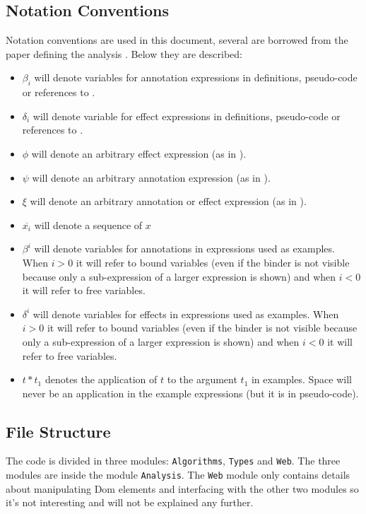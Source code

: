 \documentclass[8pt]{extarticle}
\begin{document}
\subsection{Notation Conventions}
Notation conventions are used in this document, several are borrowed from the paper defining the analysis \cite{analysis}. Below they are described:
\begin{itemize}
\item $\beta_i$ will denote variables for annotation expressions in definitions, pseudo-code or references to \cite{analysis}.
\item $\delta_i$ will denote variable for effect expressions in definitions, pseudo-code or references to \cite{analysis}.
\item $\phi$ will denote an arbitrary effect expression (as in \cite{analysis}).
\item $\psi$ will denote an arbitrary annotation expression (as in \cite{analysis}).
\item $\xi$ will denote an arbitrary annotation or effect expression (as in \cite{analysis}).
\item $\overline{x_i}$ will denote a sequence of $x$
\item $\beta^{i}$ will denote variables for annotations in expressions used as examples. When $i>0$ it will refer to bound variables (even if the binder is not visible because only a sub-expression of a larger expression is shown) and when $i<0$ it will refer to free variables.
\item $\delta^{i}$ will denote variables for effects in expressions used as examples. When $i>0$ it will refer to bound variables (even if the binder is not visible because only a sub-expression of a larger expression is shown) and when $i<0$ it will refer to free variables.
\item $t*t_1$ denotes the application of $t$ to the argument $t_1$ in examples. Space will never be an application in the example expressions (but it is in pseudo-code).
\end{itemize}
\subsection{File Structure}
The code is divided in three modules: \verb+Algorithms+, \verb+Types+ and \verb+Web+. The three modules are inside the module \verb+Analysis+. The \verb+Web+ module only contains details about manipulating Dom elements and interfacing with the other two modules so it's not interesting and will not be explained any further.
\end{document}
